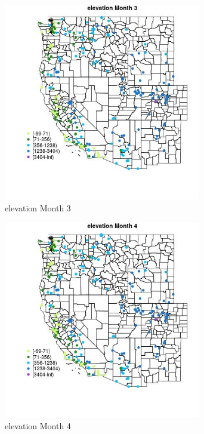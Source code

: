 \begin{figure} 
\centering  
\includegraphics[width=0.77\textwidth]{Code_Outputs/Report_ML_input_PM25_Step4_part_e_de_duplicated_aveswNAs_MapObsMo3elevation.jpg} 
\caption{\label{fig:Report_ML_input_PM25_Step4_part_e_de_duplicated_aveswNAsMapObsMo3elevation}elevation Month 3} 
\end{figure} 
 

\begin{figure} 
\centering  
\includegraphics[width=0.77\textwidth]{Code_Outputs/Report_ML_input_PM25_Step4_part_e_de_duplicated_aveswNAs_MapObsMo4elevation.jpg} 
\caption{\label{fig:Report_ML_input_PM25_Step4_part_e_de_duplicated_aveswNAsMapObsMo4elevation}elevation Month 4} 
\end{figure} 
 

